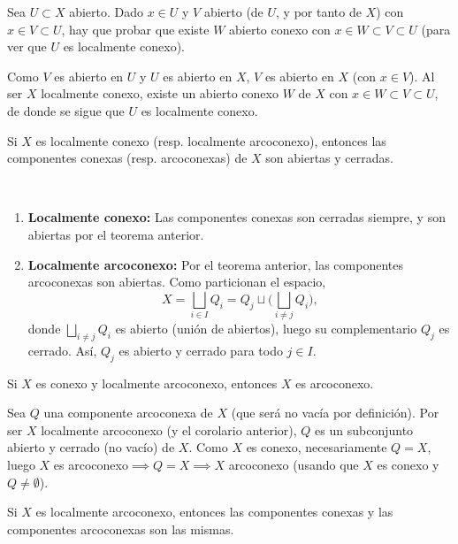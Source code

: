 \begin{dem}
Sea $U \subset X$ abierto. Dado $x \in U$ y $V$ abierto (de $U$, y por tanto de $X$) con $x \in V \subset U$, hay que probar que existe $W$ abierto conexo con $x \in W \subset V \subset U$ (para ver que $U$ es localmente conexo).

Como $V$ es abierto en $U$ y $U$ es abierto en $X$, $V$ es abierto en $X$ (con $x\in V$). Al ser $X$ localmente conexo, existe un abierto conexo $W$ de $X$ con $x \in W \subset V \subset U$, de donde se sigue que $U$ es localmente conexo.
\end{dem}

\begin{cor}
Si $X$ es localmente conexo (resp. localmente arcoconexo), entonces las componentes conexas (resp. arcoconexas) de $X$ son abiertas y cerradas.
\end{cor}

\begin{dem} \,
\begin{enumerate}
    \item \textbf{Localmente conexo:} Las componentes conexas son cerradas siempre, y son abiertas por el teorema anterior.
    \item \textbf{Localmente arcoconexo:} Por el teorema anterior, las componentes arcoconexas son abiertas. Como particionan el espacio,
    \[
        X = \bigsqcup_{i \in I} Q_i = Q_j \sqcup \Big(\bigsqcup_{i \neq j} Q_i\Big),
    \]
    donde $\bigsqcup_{i \neq j} Q_i$ es abierto (unión de abiertos), luego su complementario $Q_j$ es cerrado. Así, $Q_j$ es abierto y cerrado para todo $j \in I$.
\end{enumerate}
\end{dem}

\begin{teo}
Si $X$ es conexo y localmente arcoconexo, entonces $X$ es arcoconexo.
\end{teo}

\begin{dem}
Sea $Q$ una componente arcoconexa de $X$ (que será no vacía por definición). Por ser $X$ localmente arcoconexo (y el corolario anterior), $Q$ es un subconjunto abierto y cerrado (no vacío) de $X$. Como $X$ es conexo, necesariamente $Q = X$, luego $X$ es arcoconexo$\implies Q = X \implies X$ arcoconexo (usando que $X$ es conexo y $Q \neq \emptyset$).
\end{dem}

\begin{cor}
Si $X$ es localmente arcoconexo, entonces las componentes conexas y las componentes arcoconexas son las mismas.
\end{cor}

